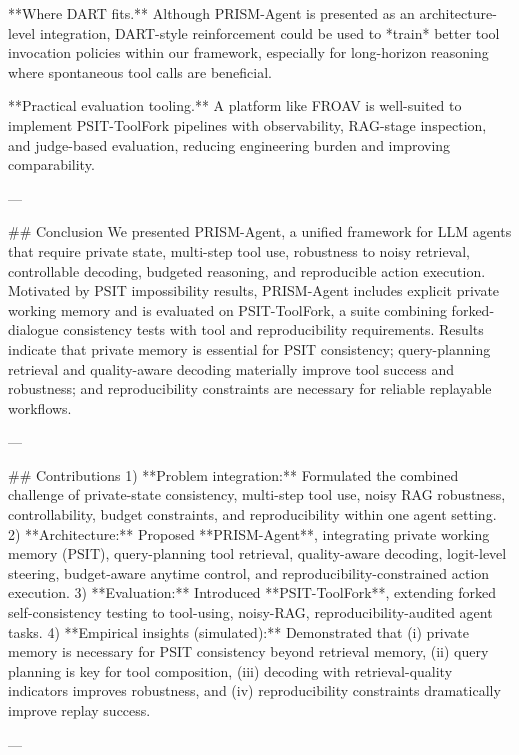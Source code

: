 **Where DART fits.** Although PRISM-Agent is presented as an architecture-level integration, DART-style reinforcement could be used to *train* better tool invocation policies within our framework, especially for long-horizon reasoning where spontaneous tool calls are beneficial.

**Practical evaluation tooling.** A platform like FROAV is well-suited to implement PSIT-ToolFork pipelines with observability, RAG-stage inspection, and judge-based evaluation, reducing engineering burden and improving comparability.

---

## Conclusion  
We presented PRISM-Agent, a unified framework for LLM agents that require private state, multi-step tool use, robustness to noisy retrieval, controllable decoding, budgeted reasoning, and reproducible action execution. Motivated by PSIT impossibility results, PRISM-Agent includes explicit private working memory and is evaluated on PSIT-ToolFork, a suite combining forked-dialogue consistency tests with tool and reproducibility requirements. Results indicate that private memory is essential for PSIT consistency; query-planning retrieval and quality-aware decoding materially improve tool success and robustness; and reproducibility constraints are necessary for reliable replayable workflows.

---

## Contributions  
1) **Problem integration:** Formulated the combined challenge of private-state consistency, multi-step tool use, noisy RAG robustness, controllability, budget constraints, and reproducibility within one agent setting.  
2) **Architecture:** Proposed **PRISM-Agent**, integrating private working memory (PSIT), query-planning tool retrieval, quality-aware decoding, logit-level steering, budget-aware anytime control, and reproducibility-constrained action execution.  
3) **Evaluation:** Introduced **PSIT-ToolFork**, extending forked self-consistency testing to tool-using, noisy-RAG, reproducibility-audited agent tasks.  
4) **Empirical insights (simulated):** Demonstrated that (i) private memory is necessary for PSIT consistency beyond retrieval memory, (ii) query planning is key for tool composition, (iii) decoding with retrieval-quality indicators improves robustness, and (iv) reproducibility constraints dramatically improve replay success.

---